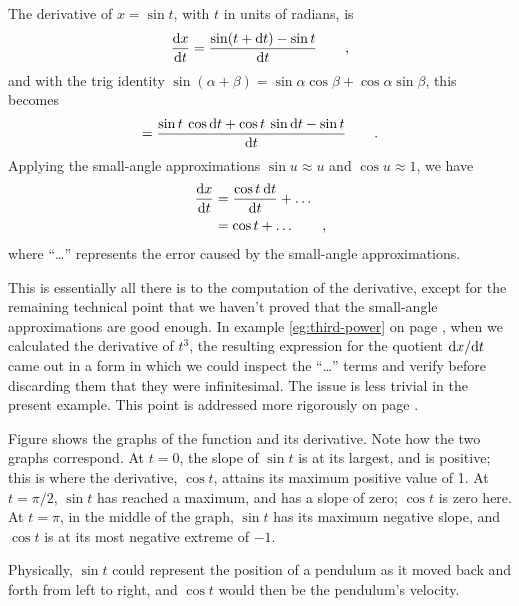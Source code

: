 \pagebreak


\begin{eg}\label{eg:derivative-of-sin}
The derivative of $x=\sin t$, with $t$ in units of radians, is
\begin{equation*}
  \frac{\textup{d} x}{\textup{d} t} = \frac{\sin(t+\textup{d} t)-\sin t}{\textup{d} t} \qquad , 
\end{equation*}
and with the trig identity $\sin(\alpha+\beta)=\sin\alpha\cos\beta+\cos\alpha\sin\beta$, this becomes
\begin{equation*}
                        = \frac{\sin t \: \cos \textup{d} t + \cos t \: \sin \textup{d} t - \sin t}{\textup{d} t} \qquad .
\end{equation*}
Applying the small-angle approximations $\sin u\approx u$ and $\cos u\approx 1$,
we have
\begin{align*}
\frac{\textup{d} x}{\textup{d} t}   &= \frac{\cos t \: \textup{d} t}{\textup{d} t} + \ldots\\
                        &= \cos t + \ldots \qquad ,
\end{align*}
where ``\ldots'' represents the error caused by the small-angle approximations.

This is essentially all there is to the computation of the derivative, except for the remaining technical
point that we haven't proved that the small-angle approximations are good enough. In example \ref{eg:third-power} on page \pageref{eg:third-power},
when we calculated the derivative of $t^3$, the resulting expression for the quotient $\textup{d} x/\textup{d} t$
came out in a form in which we could inspect the ``\ldots'' terms and verify before discarding them that they were infinitesimal.
The issue is less trivial in the present example.
This point is addressed more rigorously on page \pageref{detour:sin-rigor}.

Figure  shows the graphs of the function and its derivative. Note how the two
graphs correspond. At $t=0$, the slope of $\sin t$ is at its largest, and is positive; this is where
the derivative, $\cos t$, attains its maximum positive value of 1. At $t=\pi/2$, $\sin t$ has reached
a maximum, and has a slope of zero; $\cos t$ is zero here. At $t=\pi$, in the middle of the graph,
$\sin t$ has its maximum negative slope, and $\cos t$ is at its most negative extreme of $-1$.

Physically, $\sin t$ could represent the position of a pendulum as it moved back and forth from left
to right, and $\cos t$ would then be the pendulum's velocity.
\end{eg}

